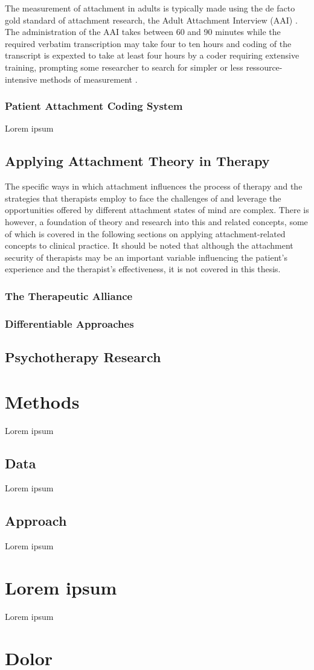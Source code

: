 \documentclass[12pt]{report}
\begin{document}
The measurement of attachment in adults is typically made using the de facto gold standard of attachment research, the Adult Attachment Interview (AAI) \cite{AAITest, Talia2019, haltigan2014adult}. The administration of the AAI takes between 60 and 90 minutes while the required verbatim transcription may take four to ten hours and coding of the transcript is expexted to take at least four hours by a coder requiring extensive training, prompting some researcher to search for simpler or less ressource-intensive methods of measurement \cite{Haas1994}.

\subsection{Patient Attachment Coding System}
Lorem ipsum \cite{Talia2017}

\section{Applying Attachment Theory in Therapy}
The specific ways in which attachment influences the process of therapy and the strategies that therapists employ to face the challenges of and leverage the opportunities offered by different attachment states of mind are complex. There is however, a foundation of theory and research into this and related concepts, some of which is covered in the following sections on applying attachment-related concepts to clinical practice. It should be noted that although the attachment security of therapists may be an important variable influencing the patient's experience and the therapist's effectiveness\cite{Mikulincer2013, Daniel2006, Dozier1994, Cologon2017}, it is not covered in this thesis.
\subsection{The Therapeutic Alliance}

\subsection{Differentiable Approaches}

\section{Psychotherapy Research}

\chapter{Methods}
Lorem ipsum

\section{Data}
Lorem ipsum

\section{Approach}
Lorem ipsum



\appendix
\chapter{Lorem ipsum}
Lorem ipsum

\chapter{Dolor}
\end{document}

